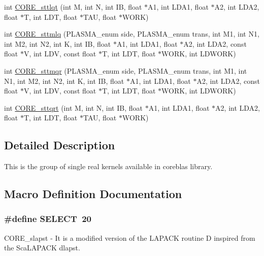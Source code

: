 \begin{DoxyCompactItemize}
\item 
int \hyperlink{group__CORE__float_gad3d9b4512ef35626101090f9444d4d75_gad3d9b4512ef35626101090f9444d4d75}{C\+O\+R\+E\+\_\+sttlqt} (int M, int N, int I\+B, float $\ast$A1, int L\+D\+A1, float $\ast$A2, int L\+D\+A2, float $\ast$T, int L\+D\+T, float $\ast$T\+A\+U, float $\ast$W\+O\+R\+K)
\item 
int \hyperlink{group__CORE__float_ga83ae67f41c6d8dd7cb45ed040d9b0157_ga83ae67f41c6d8dd7cb45ed040d9b0157}{C\+O\+R\+E\+\_\+sttmlq} (P\+L\+A\+S\+M\+A\+\_\+enum side, P\+L\+A\+S\+M\+A\+\_\+enum trans, int M1, int N1, int M2, int N2, int K, int I\+B, float $\ast$A1, int L\+D\+A1, float $\ast$A2, int L\+D\+A2, const float $\ast$V, int L\+D\+V, const float $\ast$T, int L\+D\+T, float $\ast$W\+O\+R\+K, int L\+D\+W\+O\+R\+K)
\item 
int \hyperlink{group__CORE__float_gab9dbc1e89497ed9ac1543f7c3731cb37_gab9dbc1e89497ed9ac1543f7c3731cb37}{C\+O\+R\+E\+\_\+sttmqr} (P\+L\+A\+S\+M\+A\+\_\+enum side, P\+L\+A\+S\+M\+A\+\_\+enum trans, int M1, int N1, int M2, int N2, int K, int I\+B, float $\ast$A1, int L\+D\+A1, float $\ast$A2, int L\+D\+A2, const float $\ast$V, int L\+D\+V, const float $\ast$T, int L\+D\+T, float $\ast$W\+O\+R\+K, int L\+D\+W\+O\+R\+K)
\item 
int \hyperlink{group__CORE__float_gac9728dbfbbde3275f739c96c006b18ed_gac9728dbfbbde3275f739c96c006b18ed}{C\+O\+R\+E\+\_\+sttqrt} (int M, int N, int I\+B, float $\ast$A1, int L\+D\+A1, float $\ast$A2, int L\+D\+A2, float $\ast$T, int L\+D\+T, float $\ast$T\+A\+U, float $\ast$W\+O\+R\+K)
\end{DoxyCompactItemize}


\subsection{Detailed Description}
This is the group of single real kernels available in coreblas library. 

\subsection{Macro Definition Documentation}
\hypertarget{group__CORE__float_ga53dc4af00adc7b3b4d12eafb71596dfc_ga53dc4af00adc7b3b4d12eafb71596dfc}{}
\subsubsection[{S\+E\+L\+E\+C\+T}]{\setlength{\rightskip}{0pt plus 5cm}\#define S\+E\+L\+E\+C\+T~20}\label{group__CORE__float_ga53dc4af00adc7b3b4d12eafb71596dfc_ga53dc4af00adc7b3b4d12eafb71596dfc}
C\+O\+R\+E\+\_\+slapst -\/ It is a modified version of the L\+A\+P\+A\+C\+K routine D inspired from the Sca\+L\+A\+P\+A\+C\+K dlapst.

